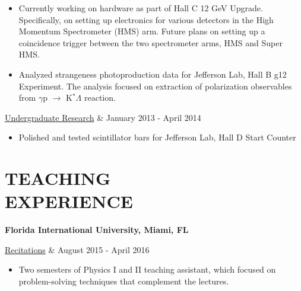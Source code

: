 \documentclass[margin]{res}
\begin{document}
\begin{resume}
\begin{itemize}
               \item  Currently working on hardware as part of Hall C 12 GeV Upgrade. Specifically, on setting up electronics for various detectors in the High Momentum Spectrometer (HMS) arm. 
              Future plans on setting up a coincidence trigger between the two spectrometer arms, HMS and Super HMS.    
              
              \item  Analyzed strangeness photoproduction data for Jefferson Lab, Hall B g12 Experiment. The analysis focused on extraction of
              polarization observables from $\gamma$p $\rightarrow$ K$^{*}$$\Lambda$ reaction.
                

  \end{itemize}
               
                \begin{ncolumn}{2} %
                \underline{Undergraduate Research}     &      January 2013 - April 2014 
                \vspace{5mm}
                \end{ncolumn}\begin{itemize}
\item Polished and tested scintillator bars for Jefferson Lab, Hall D Start Counter 
 \end{itemize}
 
 \section{\footnotesize TEACHING\\EXPERIENCE} {\bf Florida International University, Miami, FL} 
 
         \begin{ncolumn}{2} %
                \underline{Recitations} &   August 2015 - April 2016 
                \end{ncolumn}
                \vspace{1mm}
                
                \begin{itemize}
               
                \item  Two semesters of Physics I and II teaching assistant, which focused on problem-solving techniques that 
                      complement the lectures.
                
                \end{itemize}
                

\end{resume}
\end{document}

